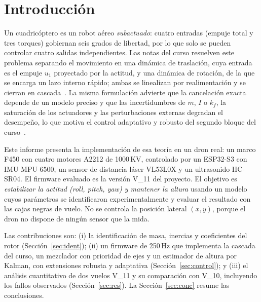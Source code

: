 \section{Introducción}
\label{sec:intro}

Un cuadricóptero es un robot aéreo \emph{subactuado}: cuatro entradas (empuje total y tres torques) gobiernan seis grados de libertad, por lo que solo se pueden controlar cuatro salidas independientes. Las notas del curso resuelven este problema separando el movimiento en una dinámica de traslación, cuya entrada es el empuje $u_1$ proyectado por la actitud, y una dinámica de rotación, de la que se encarga un lazo interno rápido; ambas se linealizan por realimentación y se cierran en cascada~\cite{notas1}. La misma formulación advierte que la cancelación exacta depende de un modelo preciso y que las incertidumbres de $m$, $I$ o $k_f$, la saturación de los actuadores y las perturbaciones externas degradan el desempeño, lo que motiva el control adaptativo y robusto del segundo bloque del curso~\cite{notas2}.

Este informe presenta la implementación de esa teoría en un dron real: un marco F450 con cuatro motores A2212 de 1000\,KV, controlado por un ESP32-S3 con IMU MPU-6500, un sensor de distancia láser VL53L0X y un ultrasonido HC-SR04. El firmware evaluado es la versión V\_11 del proyecto. El objetivo es \emph{estabilizar la actitud (roll, pitch, yaw) y mantener la altura} usando un modelo cuyos parámetros se identificaron experimentalmente y evaluar el resultado con las cajas negras de vuelo. No se controla la posición lateral $(x,y)$, porque el dron no dispone de ningún sensor que la mida.

Las contribuciones son: (i) la identificación de masa, inercias y coeficientes del rotor (Sección~\ref{sec:ident}); (ii) un firmware de 250\,Hz que implementa la cascada del curso, un mezclador con prioridad de ejes y un estimador de altura por Kalman, con extensiones robusta y adaptativa (Sección~\ref{sec:control}); y (iii) el análisis cuantitativo de dos vuelos V\_11 y su comparación con V\_10, incluyendo los fallos observados (Sección~\ref{sec:res}). La Sección~\ref{sec:conc} resume las conclusiones.
